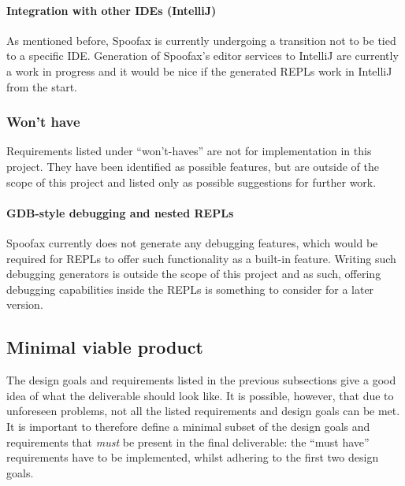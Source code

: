 \paragraph{Integration with other IDEs (IntelliJ)} As mentioned before, Spoofax
is currently undergoing a transition not to be tied to a specific IDE.
Generation of Spoofax's editor services to IntelliJ are currently a work in
progress and it would be nice if the generated REPLs work in IntelliJ from the
start.

\subsubsection{Won't have}

Requirements listed under ``won't-haves'' are not for implementation in this
project. They have been identified as possible features, but are outside of the
scope of this project and listed only as possible suggestions for further work.

\paragraph{GDB-style debugging and nested REPLs} Spoofax currently does not
generate any debugging features, which would be required for REPLs to offer such
functionality as a built-in feature. Writing such debugging generators is
outside the scope of this project and as such, offering debugging capabilities
inside the REPLs is something to consider for a later version.

\subsection{Minimal viable product}
\label{ssec:mvp}

The design goals and requirements listed in the previous subsections give a good
idea of what the deliverable should look like. It is possible, however, that due
to unforeseen problems, not all the listed requirements and design goals can be
met. It is important to therefore define a minimal subset of the design goals
and requirements that \emph{must} be present in the final deliverable: the
``must have'' requirements have to be implemented, whilst adhering to the first
two design goals.

